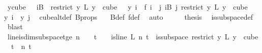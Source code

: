 \begin{isabellebody}
\ {\isachardoublequoteopen}{\isacharparenleft}{\kern0pt}{\isasymforall}y{\isasymin}cube\ {}\ {}{\isachardot}{\kern0pt}\ {\isacharparenleft}{\kern0pt}{\isasymforall}i{\isasymin}B\ {}{\isachardot}{\kern0pt}\ {\isacharparenleft}{\kern0pt}restrict\ {\isacharparenleft}{\kern0pt}{\isasymlambda}y{\isachardot}{\kern0pt}\ L\ {\isacharparenleft}{\kern0pt}y\ {}{\isacharparenright}{\kern0pt}{\isacharparenright}{\kern0pt}\ {\isacharparenleft}{\kern0pt}cube\ {}\ {}{\isacharparenright}{\kern0pt}{\isacharparenright}{\kern0pt}\ y\ i\ {\isacharequal}{\kern0pt}\ f\ i{\isacharparenright}{\kern0pt}\ {\isasymand}\ {\isacharparenleft}{\kern0pt}{\isasymforall}j{\isacharless}{\kern0pt}{}{\isachardot}{\kern0pt}\ {\isasymforall}i{\isasymin}B\ j{\isachardot}{\kern0pt}\ {\isacharparenleft}{\kern0pt}restrict\ {\isacharparenleft}{\kern0pt}{\isasymlambda}y{\isachardot}{\kern0pt}\ L\ {\isacharparenleft}{\kern0pt}y\ {}{\isacharparenright}{\kern0pt}{\isacharparenright}{\kern0pt}\ {\isacharparenleft}{\kern0pt}cube\ {}\ {}{\isacharparenright}{\kern0pt}{\isacharparenright}{\kern0pt}\ y\ i\ {\isacharequal}{\kern0pt}\ y\ j{\isacharparenright}{\kern0pt}{\isacharparenright}{\kern0pt}{\isachardoublequoteclose}\ \isamarkupfalse%
\ cube{}{\isacharunderscore}{\kern0pt}alt{\isacharunderscore}{\kern0pt}def\ B{\isacharunderscore}{\kern0pt}props\ {\isacharasterisk}{\kern0pt}\ \isamarkupfalse%
\ B{\isacharunderscore}{\kern0pt}def\ f{\isacharunderscore}{\kern0pt}def\ \isamarkupfalse%
\ auto\isanewline
\ \ \isamarkupfalse%
\ \isamarkupfalse%
\ {\isacharquery}{\kern0pt}thesis\ \isamarkupfalse%
\ is{\isacharunderscore}{\kern0pt}subspace{\isacharunderscore}{\kern0pt}def\ \isamarkupfalse%
\ blast\ \isanewline
{}\isamarkupfalse%
%
\endisatagproof
{\isafoldproof}%
%
\isadelimproof
\isanewline
%
\endisadelimproof
\isanewline
{}\isamarkupfalse%
\ line{\isacharunderscore}{\kern0pt}is{\isacharunderscore}{\kern0pt}dim{}{\isacharunderscore}{\kern0pt}subspace{\isacharunderscore}{\kern0pt}t{\isacharunderscore}{\kern0pt}ge{\isacharunderscore}{\kern0pt}{}{\isacharcolon}{\kern0pt}\ {\isachardoublequoteopen}n\ {\isachargreater}{\kern0pt}\ {}\ {\isasymLongrightarrow}\ t\ {\isachargreater}{\kern0pt}\ {}\ {\isasymLongrightarrow}\ is{\isacharunderscore}{\kern0pt}line\ L\ n\ t\ {\isasymLongrightarrow}\ is{\isacharunderscore}{\kern0pt}subspace\ {\isacharparenleft}{\kern0pt}restrict\ {\isacharparenleft}{\kern0pt}{\isasymlambda}y{\isachardot}{\kern0pt}\ L\ {\isacharparenleft}{\kern0pt}y\ {}{\isacharparenright}{\kern0pt}{\isacharparenright}{\kern0pt}\ {\isacharparenleft}{\kern0pt}cube\ {}\ t{\isacharparenright}{\kern0pt}{\isacharparenright}{\kern0pt}\ {}\ n\ t{\isachardoublequoteclose}\isanewline

\end{isabellebody}
